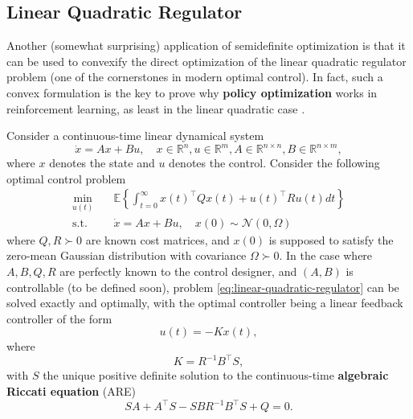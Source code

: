 \documentclass[
]{book}
\theoremstyle{definition}
\theoremstyle{definition}
\theoremstyle{definition}
\theoremstyle{definition}
\theoremstyle{remark}
\begin{document}
\hypertarget{linear-quadratic-regulator}{%
\subsection{Linear Quadratic Regulator}\label{linear-quadratic-regulator}}

Another (somewhat surprising) application of semidefinite optimization is that it can be used to convexify the direct optimization of the linear quadratic regulator problem (one of the cornerstones in modern optimal control). In fact, such a convex formulation is the key to prove why \textbf{policy optimization} works in reinforcement learning, as least in the linear quadratic case \citep{hu23review-toward} \citep{mohammadi21tac-convergence}.

Consider a continuous-time linear dynamical system
\begin{equation}
\dot{x} = A x + B u, \quad x \in \mathbb{R}^{n}, u \in \mathbb{R}^{m}, A \in \mathbb{R}^{n \times n}, B \in \mathbb{R}^{n \times m},
\label{eq:ct-linear-dynamical}
\end{equation}
where \(x\) denotes the state and \(u\) denotes the control. Consider the following optimal control problem
\begin{equation}
\begin{split}
\min_{u(t)}  & \quad \mathbb{E} \left\{  \int_{t=0}^{\infty} x(t)^\top Q x(t) + u(t)^\top R u(t) dt  \right\}  \\
\mathrm{s.t.}& \quad \dot{x} = A x + Bu, \quad x(0) \sim \mathcal{N}(0,\Omega)
\end{split}
\label{eq:linear-quadratic-regulator}
\end{equation}
where \(Q,R\succ 0\) are known cost matrices, and \(x(0)\) is supposed to satisfy the zero-mean Gaussian distribution with covariance \(\Omega \succ 0\). In the case where \(A,B,Q,R\) are perfectly known to the control designer, and \((A,B)\) is controllable (to be defined soon), problem \eqref{eq:linear-quadratic-regulator} can be solved exactly and optimally, with the optimal controller being a linear feedback controller of the form
\[
u(t) = -Kx(t),
\]
where
\[
K = R^{-1}B^\top S,
\]
with \(S\) the unique positive definite solution to the continuous-time \textbf{algebraic Riccati equation} (ARE)
\[
SA + A^\top S - SBR^{-1}B^\top S + Q = 0.
\]
\end{document}
